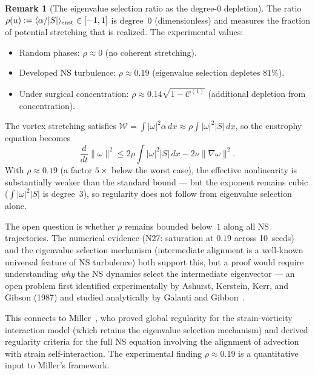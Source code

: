 \documentclass[11pt]{article}
\theoremstyle{definition}
\newtheorem{remark}[theorem]{Remark}
\newcommand{\cC}{\mathcal{C}}
\begin{document}
\begin{remark}[The eigenvalue selection ratio
as the degree-0 depletion]
\label{rem:eigenvalue-selection}
The ratio $\rho(u):=\langle\alpha/|S|\rangle_{\rm enst}
\in[-1,1]$ is degree~0 (dimensionless) and
measures the fraction of potential stretching
that is realized.  The experimental values:
\begin{itemize}[leftmargin=2em]
\item Random phases: $\rho\approx 0$ (no
  coherent stretching).
\item Developed NS turbulence: $\rho\approx 0.19$
  (eigenvalue selection depletes $81\%$).
\item Under surgical concentration:
  $\rho\approx 0.14\sqrt{1-\cC^{(1)}}$
  (additional depletion from concentration).
\end{itemize}
The vortex stretching satisfies
$\mathcal{W} = \int|\omega|^2\alpha\,dx
\approx\rho\int|\omega|^2|S|\,dx$, so the
enstrophy equation becomes
\begin{equation}\label{eq:enst-depleted}
\frac{d}{dt}\|\omega\|^2 \leq
2\rho\int|\omega|^2|S|\,dx
- 2\nu\|\nabla\omega\|^2.
\end{equation}
With $\rho\approx 0.19$ (a factor $5\times$ below
the worst case), the effective nonlinearity is
substantially weaker than the standard bound ---
but the exponent remains cubic ($\int|\omega|^2|S|$
is degree~3), so regularity does not follow from
eigenvalue selection alone.

The open question is whether
$\rho$ remains bounded below~$1$ along all NS
trajectories.  The numerical evidence
(N27: saturation at $0.19$ across 10~seeds)
and the eigenvalue selection mechanism
(intermediate alignment is a well-known
universal feature of NS turbulence) both
support this, but a proof would require
understanding \emph{why} the NS dynamics
select the intermediate eigenvector --- an
open problem first identified
experimentally by Ashurst, Kerstein, Kerr,
and Gibson (1987) and studied analytically
by Galanti and
Gibbon~\cite{GalantiGibbon1997}.
\end{remark}

This connects to Miller~\cite{Miller2024}, who
proved global regularity for the strain-vorticity
interaction model (which retains the eigenvalue
selection mechanism) and derived regularity criteria
for the full NS equation involving the alignment
of advection with strain self-interaction.
The experimental finding $\rho\approx 0.19$ is a
quantitative input to Miller's framework.
\end{document}
